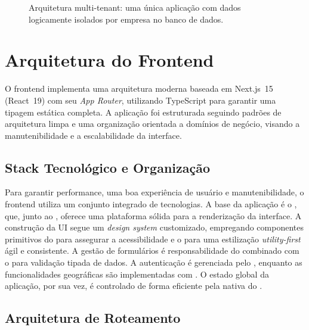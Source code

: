 \begin{figure}[H]
  \caption{Arquitetura multi-tenant: uma única aplicação com dados logicamente isolados por empresa no banco de dados.}
  \label{fig:multi-tenant-melhorada}
\end{figure}

\section{Arquitetura do Frontend}

O frontend implementa uma arquitetura moderna baseada em Next.js~15 (React~19) com seu \textit{App Router}, utilizando TypeScript para garantir uma tipagem estática completa. A aplicação foi estruturada seguindo padrões de arquitetura limpa e uma organização orientada a domínios de negócio, visando a manutenibilidade e a escalabilidade da interface.

\subsection{Stack Tecnológico e Organização}

Para garantir performance, uma boa experiência de usuário e manutenibilidade, o frontend utiliza um conjunto integrado de tecnologias. A base da aplicação é o , que, junto ao , oferece uma plataforma sólida para a renderização da interface. A construção da UI segue um \textit{design system} customizado, empregando componentes primitivos do  para assegurar a acessibilidade e o  para uma estilização \textit{utility-first} ágil e consistente. A gestão de formulários é responsabilidade do  combinado com o  para validação tipada de dados. A autenticação é gerenciada pelo , enquanto as funcionalidades geográficas são implementadas com . O estado global da aplicação, por sua vez, é controlado de forma eficiente pela  nativa do .

\subsection{Arquitetura de Roteamento}

